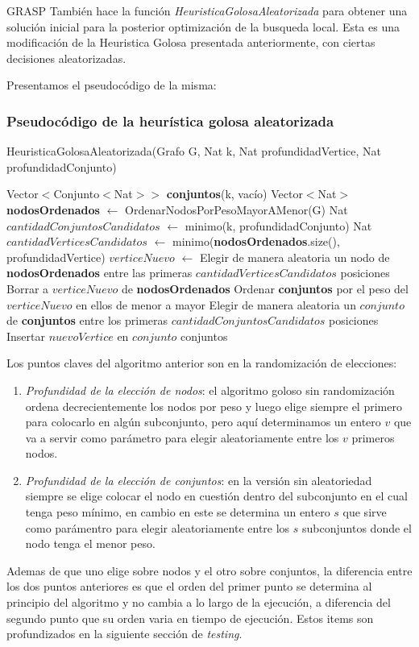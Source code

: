 GRASP También hace la función \textit{HeuristicaGolosaAleatorizada} para obtener una solución inicial para la posterior optimización de la busqueda local.
Esta es una modificación de la Heuristica Golosa presentada anteriormente, con ciertas decisiones aleatorizadas.

Presentamos el pseudocódigo de la misma:

\subsubsection{Pseudocódigo de la heurística golosa aleatorizada}
\begin{algorithm}[H]
\begin{algorithmic}[1]
\caption{HeuristicaGolosaAleatorizada(Grafo G, Nat k, Nat profundidadVertice, Nat profundidadConjunto)}
\STATE Vector$<$Conjunto$<$Nat$>>$ \textbf{conjuntos}(k, vacío)
\STATE Vector$<$Nat$>$ \textbf{nodosOrdenados} $\leftarrow$ OrdenarNodosPorPesoMayorAMenor(G)
\STATE Nat $cantidadConjuntosCandidatos$ $\leftarrow$ minimo(k, profundidadConjunto)
    \STATE Nat $cantidadVerticesCandidatos$ $\leftarrow$ minimo(\textbf{nodosOrdenados}.size(), profundidadVertice)
    \STATE $verticeNuevo$ $\leftarrow$ Elegir de manera aleatoria un nodo de \textbf{nodosOrdenados} entre las primeras $cantidadVerticesCandidatos$ posiciones
    \STATE Borrar a $verticeNuevo$ de \textbf{nodosOrdenados}
    \STATE Ordenar \textbf{conjuntos} por el peso del $verticeNuevo$ en ellos de menor a mayor
    \STATE Elegir de manera aleatoria un $conjunto$ de \textbf{conjuntos} entre los primeras $cantidadConjuntosCandidatos$ posiciones
    \STATE Insertar $nuevoVertice$ en $conjunto$
\ENDWHILE
\RETURN conjuntos
\end{algorithmic}
\end{algorithm}

Los puntos claves del algoritmo anterior son en la randomización de elecciones:
\begin{enumerate}
    \item \textit{Profundidad de la elección de nodos}: el algoritmo goloso sin randomización ordena decrecientemente los nodos por peso y luego elige siempre el primero para colocarlo en algún subconjunto, pero aquí determinamos un entero $v$ que va a servir como parámetro para elegir aleatoriamente entre los $v$ primeros nodos.
    \item \textit{Profundidad de la elección de conjuntos}: en la versión sin aleatoriedad siempre se elige colocar el nodo en cuestión dentro del subconjunto en el cual tenga peso mínimo, en cambio en este se determina un entero $s$ que sirve como parámentro para elegir aleatoriamente entre los $s$ subconjuntos donde el nodo tenga el menor peso.
\end{enumerate} 
Ademas de que uno elige sobre nodos y el otro sobre conjuntos, la diferencia entre los dos puntos anteriores es que el orden del primer punto se determina al principio del algoritmo y no cambia a lo largo de la ejecución, a diferencia del segundo punto que su orden varia en tiempo de ejecución. Estos items son profundizados en la siguiente sección de \textit{testing}.



